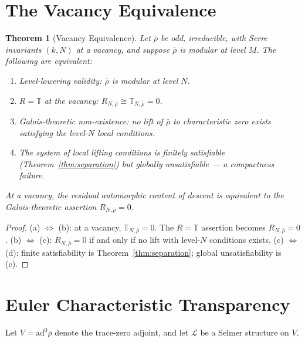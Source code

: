 \documentclass[12pt]{amsart}
\newtheorem{theorem}{Theorem}[section]
\theoremstyle{definition}
\theoremstyle{remark}
\newcommand{\ad}{\mathrm{ad}}
\newcommand{\rhobar}{\bar{\rho}}
\begin{document}
\section{The Vacancy Equivalence}
\label{sec:vacancy-equiv}

\begin{theorem}[Vacancy Equivalence]\label{thm:vacancy-equiv}
Let $\rhobar$ be odd, irreducible, with Serre invariants $(k, N)$ at a vacancy, and suppose $\rhobar$ is modular at level $M$. The following are equivalent:
\begin{enumerate}[label=(\alph*)]
\item Level-lowering validity: $\rhobar$ is modular at level $N$.
\item $R = \mathbb{T}$ at the vacancy: $R_{N,\rhobar} \cong \mathbb{T}_{N,\rhobar} = 0$.
\item Galois-theoretic non-existence: no lift of $\rhobar$ to characteristic zero exists satisfying the level-$N$ local conditions.
\item The system of local lifting conditions is finitely satisfiable (Theorem~\ref{thm:separation}) but globally unsatisfiable --- a compactness failure.
\end{enumerate}
At a vacancy, the residual automorphic content of descent is equivalent to the Galois-theoretic assertion $R_{N,\rhobar} = 0$.
\end{theorem}

\begin{proof}
(a) $\Leftrightarrow$ (b): at a vacancy, $\mathbb{T}_{N,\rhobar} = 0$. The $R = \mathbb{T}$ assertion becomes $R_{N,\rhobar} = 0$. (b) $\Leftrightarrow$ (c): $R_{N,\rhobar} = 0$ if and only if no lift with level-$N$ conditions exists. (c) $\Leftrightarrow$ (d): finite satisfiability is Theorem~\ref{thm:separation}; global unsatisfiability is (c).
\end{proof}

\section{Euler Characteristic Transparency}
\label{sec:euler}

Let $V = \ad^0\rhobar$ denote the trace-zero adjoint, and let $\mathcal{L}$ be a Selmer structure on $V$.
\end{document}
